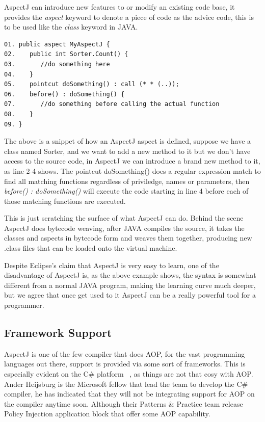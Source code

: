 AspectJ can introduce new features to or modify an existing code base, it provides the {\em aspect} keyword to denote a piece of code as the advice code, this is to be used like the {\em class} keyword in JAVA.

\begin{verbatim}
01. public aspect MyAspectJ {
02.    public int Sorter.Count() {
03.       //do something here
04.    }
05.    pointcut doSomething() : call (* * (..));
06.    before() : doSomething() {
07.       //do something before calling the actual function
08.    }
09. }
\end{verbatim}

The above is a snippet of how an AspectJ aspect is defined, suppose we have a class named Sorter, and we want to add a new method to it but we don't have access to the source code, in AspectJ we can introduce a brand new method to it, as line 2-4 shows. The pointcut doSomething() does a regular expression match to find all matching functions regardless of priviledge, names or parameters, then {\em before() : doSomething()} will execute the code starting in line 4 before each of those matching functions are executed.

This is just scratching the surface of what AspectJ can do. Behind the scene AspectJ does bytecode weaving, after JAVA compiles the source, it takes the classes and aspects in bytecode form and weaves them together, producing new .class files that can be loaded onto the virtual machine.

Despite Eclipse's claim that AspectJ is very easy to learn, one of the disadvantage of AspectJ is, as the above example shows, the syntax is somewhat different from a normal JAVA program, making the learning curve much deeper, but we agree that once get used to it AspectJ can be a really powerful tool for a programmer.

\subsection{Framework Support}

AspectJ is one of the few compiler that does AOP, for the vast programming languages out there, support is provided via some sort of frameworks. This is especially evident on the C\# platform ~\cite{aopcs}, as things are not that cosy with AOP. Ander Heijsburg is the Microsoft fellow that lead the team to develop the C\# compiler, he has indicated that they will not be integrating support for AOP on the compiler anytime soon. Although their Patterns \& Practice team release Policy Injection application block that offer some AOP capability.

